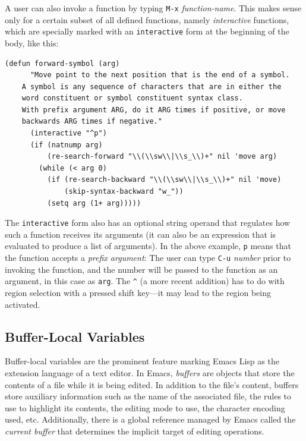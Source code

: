\documentclass[format=acmsmall,screen]{acmart}
\newcommand \Elisp {Emacs Lisp}
\begin{document}
A user can also invoke a function by typing \texttt{M-x}
\emph{function-name}.  This makes sense only for a certain subset of
all defined functions, namely \emph{interactive} functions, which
are specially marked with an \texttt{interactive} form at the
beginning of the body, like this:
\begin{Verbatim}[samepage=true]
    (defun forward-symbol (arg)
      "Move point to the next position that is the end of a symbol.
    A symbol is any sequence of characters that are in either the
    word constituent or symbol constituent syntax class.
    With prefix argument ARG, do it ARG times if positive, or move
    backwards ARG times if negative."
      (interactive "^p")
      (if (natnump arg)
          (re-search-forward "\\(\\sw\\|\\s_\\)+" nil 'move arg)
        (while (< arg 0)
          (if (re-search-backward "\\(\\sw\\|\\s_\\)+" nil 'move)
              (skip-syntax-backward "w_"))
          (setq arg (1+ arg)))))
\end{Verbatim}
The \texttt{interactive} form also has an optional string operand that
regulates how such a function receives its arguments (it can also be
an expression that is evaluated to produce a list of arguments).  In the above
example, \verb|p| means that the function accepts a \emph{prefix
  argument}: The user can type \texttt{C-u} \emph{number}
prior to invoking the function,
and the number will be passed to the function as an argument, in this
case as \texttt{arg}.  The \verb|^| (a more recent addition) has to do with
region selection with a pressed shift key---it may lead to the region
being activated.

\subsection{Buffer-Local Variables}
\label{sec:buffer-local-variables}

Buffer-local variables are the prominent feature marking \Elisp{} as the
extension language of a text editor.  In Emacs, \emph{buffers} are objects
that store the contents of a file while it is being edited.  In addition to
the file's content, buffers store auxiliary information such
as the name of the associated file, the rules to use to highlight its
contents, the editing mode to use, the character encoding used, etc.
Additionally, there is a global reference managed by Emacs called the
\emph{current buffer} that determines the implicit target of
editing operations.
\end{document}
